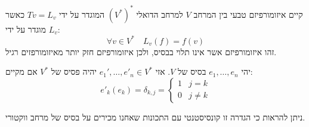 \documentclass{tstextbook}
\begin{document}
\begin{proposition}
קיים איזומורפיזם טבעי בין המרחב \(V\) למרחב הדואלי \((V^{*})^{*}\) המוגדר על ידי \(Tv=L_{v}\) כאשר \(L_{v}\) מוגדר על ידי:
$$\forall v \in V^{*}\quad L_{v}(f)=f(v)$$
זהו איזומורפיזם אשר אינו תלוי בבסיס, ולכן איזומורפיזם חזק יותר מאיזומורפזים רגיל.

\end{proposition}
\begin{definition}
יהי \(e_{1},\dots,e_{n}\) בסיס של \(V\). אזי \(e_{1}',\dots,e'_{n}\in V^{*}\) יהיה פסיס של \(V^{*}\) אם מקיים:
$$e'_{k}(e_{k})=\delta_{k,j}=\begin{cases}1 & j=k \\0 & j\neq k
\end{cases}$$

\end{definition}
ניתן להראות כי הגדרה זו קונסיסטנטי עם התכונות שאחנו מכירים על בסיס של מרחב ווקטורי. 
\end{document}
